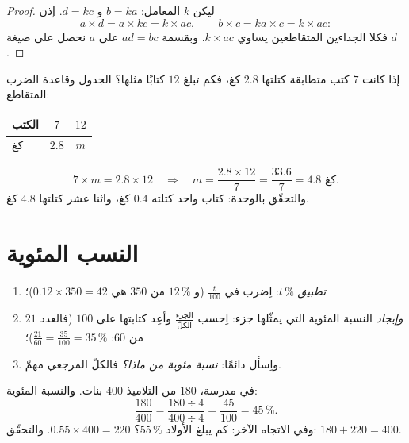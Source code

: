 \begin{proof}
ليكن $k$ المعامل: $b = ka$ و $d = kc$. إذن
\[
a \times d = a \times kc = k \times ac,
\qquad
b \times c = ka \times c = k \times ac :
\]
فكلا الجداءين المتقاطعين يساوي $k \times ac$. وبقسمة $ad = bc$ على $a$
نحصل على صيغة $d$.
\end{proof}

\begin{example}\label{ex:g7:prop:fourth}
إذا كانت $7$ كتب متطابقة كتلتها $2.8$ كغ، فكم تبلغ  $12$ كتابًا
مثلها؟ الجدول وقاعدة الضرب المتقاطع:
\begin{center}
\renewcommand{\arraystretch}{1.3}
\begin{tabular}{l|cc}
الكتب & $7$ & $12$ \\
\hline
كغ & $2.8$ & $m$ \\
\end{tabular}
\end{center}
\[
7 \times m = 2.8 \times 12
\quad\Longrightarrow\quad
m = \frac{2.8 \times 12}{7} = \frac{33.6}{7} = 4.8 \text{ كغ}.
\]
والتحقّق بالوحدة: كتاب واحد كتلته $0.4$ كغ، واثنا عشر كتلتها $4.8$ كغ.
\end{example}

\section{النسب المئوية}

\begin{method}\label{met:g7:prop:percent}
\begin{enumerate}
  \item \emph{تطبيق} $t\,\%$: اِضرب في $\frac{t}{100}$
        (و $12\,\%$ من $350$ هي $0.12 \times 350 = 42$)؛
  \item \emph{وإيجاد} النسبة المئوية التي يمثّلها جزء: اِحسب
        $\frac{\text{الجزء}}{\text{الكلّ}}$ وأعِد كتابتها على  $100$
        (فالعدد $21$ من $60$: $\frac{21}{60} = \frac{35}{100} = 35\,\%$)؛
  \item واِسأل دائمًا: \emph{نسبة مئوية من ماذا؟} فالكلّ المرجعي
        مهمّ.
\end{enumerate}
\end{method}

\begin{example}\label{ex:g7:prop:percent}
في مدرسة، $180$ من التلاميذ $400$ بنات. والنسبة المئوية:
\[
\frac{180}{400} = \frac{180 \div 4}{400 \div 4} = \frac{45}{100}
= 45\,\% .
\]
وفي الاتجاه الآخر: كم يبلغ الأولاد $55\,\%$؟
$0.55 \times 400 = 220$. والتحقّق: $180 + 220 = 400$.
\end{example}

